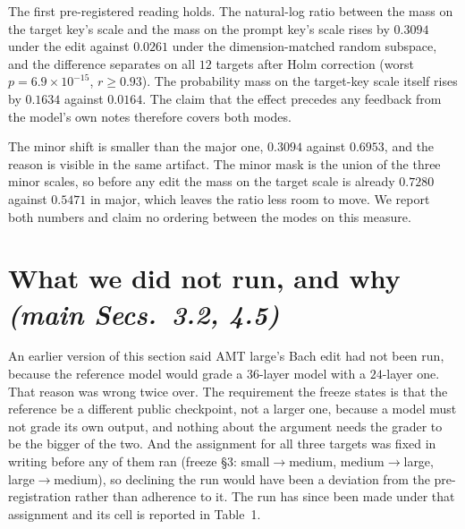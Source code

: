 \documentclass{article}
\begin{document}
The first pre-registered reading holds. The natural-log ratio between the mass on the
target key's scale and the mass on the prompt key's scale rises by $0.3094$ under
the edit against $0.0261$ under the dimension-matched random subspace, and the difference
separates on all $12$ targets after Holm correction (worst $p=6.9\times10^{-15}$,
$r\ge0.93$). The probability mass on the target-key scale itself rises by $0.1634$
against $0.0164$. The claim that the effect precedes any feedback from the model's own
notes therefore covers both modes.

The minor shift is smaller than the major one, $0.3094$ against $0.6953$, and the
reason is visible in the same artifact. The minor mask is the union of the three minor
scales, so before any edit the mass on the target scale is already $0.7280$ against
$0.5471$ in major, which leaves the ratio less room to move. We report both numbers
and claim no ordering between the modes on this measure.

\section{What we did not run, and why \normalfont\textit{(main Secs.~3.2, 4.5)}}

%
An earlier version of this section said AMT large's Bach edit had not been run, because
the reference model would grade a $36$-layer model with a $24$-layer one. That reason
was wrong twice over. The requirement the freeze states is that the reference be a
different public checkpoint, not a larger one, because a model must not grade its own
output, and nothing about the argument needs the grader to be the bigger of the two. And
the assignment for all three targets was fixed in writing before any of them ran (freeze
§3: small$\rightarrow$medium, medium$\rightarrow$large, large$\rightarrow$medium), so
declining the run would have been a deviation from the pre-registration rather than
adherence to it. The run has since been made under that assignment and its cell is
reported in Table~1.
\end{document}

